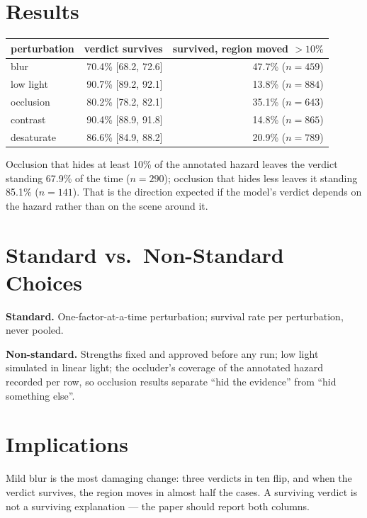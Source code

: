 \section{Results}

\begin{center}
\begin{tabular}{lrr}
\toprule
\textbf{perturbation} & \textbf{verdict survives} & \textbf{survived, region moved $>10\%$} \\
\midrule
blur       & 70.4\% [68.2, 72.6] & 47.7\% ($n=459$) \\
low light  & 90.7\% [89.2, 92.1] & 13.8\% ($n=884$) \\
occlusion  & 80.2\% [78.2, 82.1] & 35.1\% ($n=643$) \\
contrast   & 90.4\% [88.9, 91.8] & 14.8\% ($n=865$) \\
desaturate & 86.6\% [84.9, 88.2] & 20.9\% ($n=789$) \\
\bottomrule
\end{tabular}
\label{tab:s24}
\end{center}

Occlusion that hides at least 10\% of the annotated hazard leaves the verdict standing 67.9\% of the time
($n=290$); occlusion that hides less leaves it standing 85.1\% ($n=141$). That is the direction expected if
the model's verdict depends on the hazard rather than on the scene around it.

\section{Standard vs.\ Non-Standard Choices}

\textbf{Standard.} One-factor-at-a-time perturbation; survival rate per perturbation, never pooled.

\textbf{Non-standard.} Strengths fixed and approved before any run; low light simulated in linear light;
the occluder's coverage of the annotated hazard recorded per row, so occlusion results separate ``hid the
evidence'' from ``hid something else''.

\section{Implications}

Mild blur is the most damaging change: three verdicts in ten flip, and when the verdict survives, the
region moves in almost half the cases. A surviving verdict is not a surviving explanation --- the paper
should report both columns.

